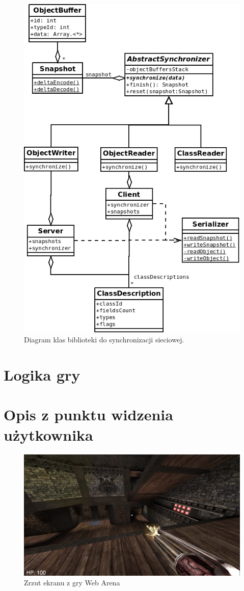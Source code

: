 \begin{figure}[h]
  \centering
  \includegraphics[scale=0.7]{zasoby/rozdzial31/network}  
  \caption{Diagram klas biblioteki do synchronizacji sieciowej.}
  \label{fig:screen}
\end{figure}


\section{Logika gry}
\label{sec:logikaGry}

\section{Opis z punktu widzenia użytkownika}

\begin{figure}[h]
  \centering
  \includegraphics[scale=0.45]{zasoby/rozdzial31/screen}  
  \caption{Zrzut ekranu z gry Web Arena}
  \label{fig:screen}
\end{figure}


